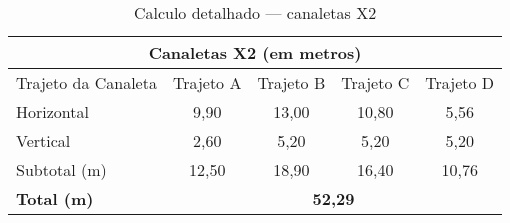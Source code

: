 \begin{table}[h!]
\caption{Calculo detalhado --- canaletas X2}
\label{tab6}
\begin{center}
	\renewcommand{\arraystretch}{1.2}
\begin{tabular}{|l|c|c|c|c|}
	\hline
	\multicolumn{5}{|c|}{\textbf{Canaletas X2 (em metros)}}                                                                                                 \\ \hline
	Trajeto da Canaleta & \multicolumn{1}{l|}{Trajeto A} & \multicolumn{1}{l|}{Trajeto B} & \multicolumn{1}{l|}{Trajeto C} & \multicolumn{1}{l|}{Trajeto D} \\ \hline
	Horizontal          & 9,90                           & 13,00                          & 10,80                          & 5,56                           \\ \hline
	Vertical            & 2,60                           & 5,20                           & 5,20                           & 5,20                           \\ \hline
	Subtotal (m)        & 12,50                          & 18,90                          & 16,40                          & 10,76                          \\ \hline
	\textbf{Total (m)}  & \multicolumn{4}{c|}{\textbf{52,29}}                                                                                               \\ \hline
\end{tabular}
\end{center}
\end{table}
